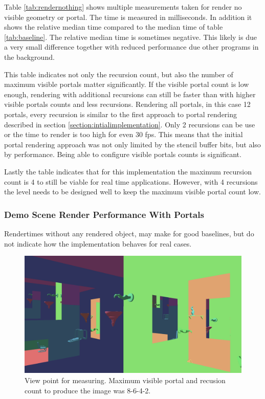 Table \ref{tab:rendernothing} shows multiple measurements taken for render no visible geometry or portal. The time is measured in milliseconds. In addition it shows the relative median time compared to the median time of table \ref{tab:baseline}. The relative median time is sometimes negative. This likely is due a very small difference together with reduced performance due other programs in the background.

This table indicates not only the recursion count, but also the number of maximum visible portals matter significantly. If the visible portal count is low enough, rendering with additional recursions can still be faster than with higher visible portals counts and less recursions. Rendering all portals, in this case 12 portals, every recursion is similar to the first approach to portal rendering described in section \ref{section:intialimplementation}. Only 2 recursions can be use or the time to render is too high for even 30 \gls{fps}. This means that the initial portal rendering approach was not only limited by the stencil buffer bits, but also by performance. Being able to configure visible portals counts is significant.

Lastly the table indicates that for this implementation the maximum recursion count is 4 to still be viable for real time applications. However, with 4 recursions the level needs to be designed well to keep the maximum visible portal count low.






\subsubsection{Demo Scene Render Performance With Portals}
\label{section:renderperformance}

Rendertimes without any rendered object, may make for good baselines, but do not indicate how the implementation behaves for real cases.  

\begin{figure}[H]
	\includegraphics[width=\linewidth]{images/testsnapshot.png}
	\caption{View point for measuring. Maximum visible portal and recusion count to produce the image was 8-6-4-2.}
	\label{fig:perfviewpoint}
\end{figure}

